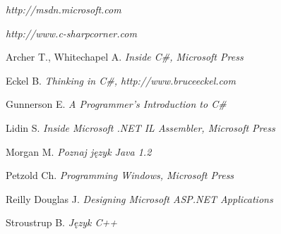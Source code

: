 ﻿\begin{thebibliography}{99999}

{\em http://msdn.microsoft.com}

{\em http://www.c-sharpcorner.com}

Archer T., Whitechapel A. {\em Inside C\#, Microsoft Press}

Eckel B. {\em Thinking in C\#, http://www.bruceeckel.com}

Gunnerson E. {\em A Programmer's Introduction to C\#}

Lidin S. {\em Inside Microsoft .NET IL Assembler, Microsoft Press}

Morgan M. {\em Poznaj język Java 1.2}

Petzold Ch. {\em Programming Windows, Microsoft Press}

Reilly Douglas J. {\em Designing Microsoft ASP.NET Applications}

Stroustrup B. {\em Język C++}

\end{thebibliography}
